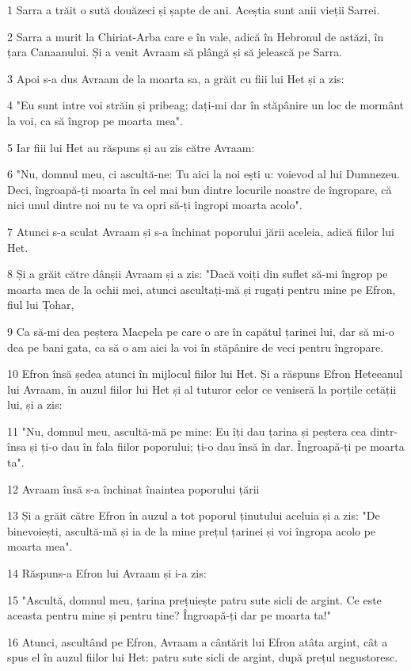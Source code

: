 \par 1 Sarra a trăit o sută douăzeci și șapte de ani. Aceștia sunt anii vieții Sarrei.
\par 2 Sarra a murit la Chiriat-Arba care e în vale, adică în Hebronul de astăzi, în țara Canaanului. Și a venit Avraam să plângă și să jelească pe Sarra.
\par 3 Apoi s-a dus Avraam de la moarta sa, a grăit cu fiii lui Het și a zis:
\par 4 "Eu sunt intre voi străin și pribeag; dați-mi dar în stăpânire un loc de mormânt la voi, ca să îngrop pe moarta mea".
\par 5 Iar fiii lui Het au răspuns și au zis către Avraam:
\par 6 "Nu, domnul meu, ci ascultă-ne: Tu aici la noi ești u: voievod al lui Dumnezeu. Deci, îngroapă-ți moarta în cel mai bun dintre locurile noastre de îngropare, că nici unul dintre noi nu te va opri să-ți îngropi moarta acolo".
\par 7 Atunci s-a sculat Avraam și s-a închinat poporului jării aceleia, adică fiilor lui Het.
\par 8 Și a grăit către dânșii Avraam și a zis: "Dacă voiți din suflet să-mi îngrop pe moarta mea de la ochii mei, atunci ascultați-mă și rugați pentru mine pe Efron, fiul lui Țohar,
\par 9 Ca să-mi dea peștera Macpela pe care o are în capătul țarinei lui, dar să mi-o dea pe bani gata, ca să o am aici la voi în stăpânire de veci pentru îngropare.
\par 10 Efron însă ședea atunci în mijlocul fiilor lui Het. Și a răspuns Efron Heteeanul lui Avraam, în auzul fiilor lui Het și al tuturor celor ce veniseră la porțile cetății lui, și a zis:
\par 11 "Nu, domnul meu, ascultă-mă pe mine: Eu îți dau țarina și peștera cea dintr-însa și ți-o dau în fala fiilor poporului; ți-o dau însă în dar. Îngroapă-ți pe moarta ta".
\par 12 Avraam însă s-a închinat înaintea poporului țării
\par 13 Și a grăit către Efron în auzul a tot poporul ținutului aceluia și a zis: "De binevoiești, ascultă-mă și ia de la mine prețul țarinei și voi îngropa acolo pe moarta mea".
\par 14 Răspuns-a Efron lui Avraam și i-a zis:
\par 15 "Ascultă, domnul meu, țarina prețuiește patru sute sicli de argint. Ce este aceasta pentru mine și pentru tine? Îngroapă-ți dar pe moarta ta!"
\par 16 Atunci, ascultând pe Efron, Avraam a cântărit lui Efron atâta argint, cât a spus el în auzul fiilor lui Het: patru sute sicli de argint, după prețul negustoresc.
